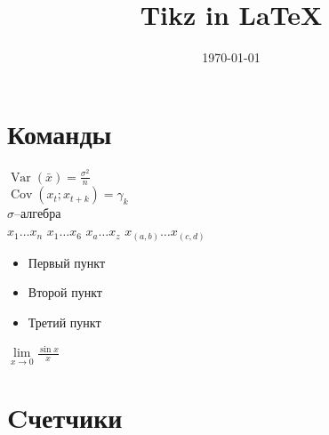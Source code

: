 \documentclass[12pt, a4paper]{article}
\title{Tikz in \LaTeX}
\date{\today}
\DeclareMathOperator{\Var}{Var}
\DeclareMathOperator{\Cov}{Cov}
\newcommand{\s}{\ensuremath{\sigma}}
\newcommand{\mdot}{\ensuremath{x_1 \ldots x_n}}
\newcommand{\com}[2]{\ensuremath{x_{#1} \ldots x_{#2}}}
\newcommand{\llim}[2]{\ensuremath{\lim\limits_{#1} #2}}
\begin{document}
\renewcommand{\thepage}{\ifthispageodd{\Asbuk{page}}{\Roman{page}}} %

\maketitle
\noindent \ignorespaces

\section{Команды}

$\Var(\bar{x})=\frac{\sigma^2}{n}$ \\
$\Cov (x_t ; x_{t+k}) = \gamma_k$ \\
\s--алгебра\\

\mdot \quad
\com{1}{6} \quad \com{a}{z} \quad \com{(a,b)}{(c,d)} \\

\begin{itemize}[label=\textcolor{blue}{\textbullet}]
\item Первый пункт
\item Второй пункт
\item Третий пункт
\end{itemize}

\llim{x\to 0}{\frac{\sin x}{x}} 

\newpage

\section{Cчетчики}
\end{document}
